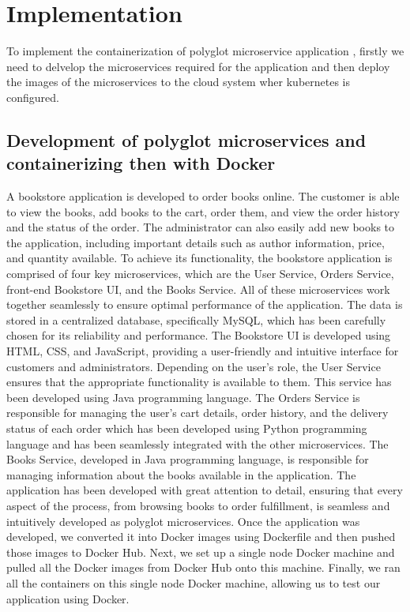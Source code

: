 \section{Implementation}
To implement the containerization of polyglot microservice application , firstly we need to delvelop the microservices required for the application and then deploy the images of the microservices to the cloud system wher kubernetes is configured. 
\subsection{Development of polyglot microservices and containerizing then with Docker}
A bookstore application is developed to order books online. The customer is able to view the books, add books to the cart, order them, and view the order history and the status of the order. The administrator can also easily add new books to the application, including important details such as author information, price, and quantity available. To achieve its functionality, the bookstore application is comprised of four key microservices, which are the User Service, Orders Service, front-end Bookstore UI, and the Books Service. All of these microservices work together seamlessly to ensure optimal performance of the application. The data is stored in a centralized database, specifically MySQL, which has been carefully chosen for its reliability and performance. The Bookstore UI is developed using HTML, CSS, and JavaScript, providing a user-friendly and intuitive interface for customers and administrators. Depending on the user's role, the User Service ensures that the appropriate functionality is available to them. This  service has been developed using Java programming language. The Orders Service is responsible for managing the user's cart details, order history, and the delivery status of each order which has been developed using Python programming language and has been seamlessly integrated with the other microservices. The Books Service, developed in Java programming language, is responsible for managing information about the books available in the application.  The application has been developed with great attention to detail, ensuring that every aspect of the process, from browsing books to order fulfillment, is seamless and intuitively developed as polyglot microservices. Once the application was developed, we converted it into Docker images using Dockerfile and then pushed those images to Docker Hub. Next, we set up a single node Docker machine and pulled all the Docker images from Docker Hub onto this machine. Finally, we ran all the containers on this single node Docker machine, allowing us to test our application using Docker.

